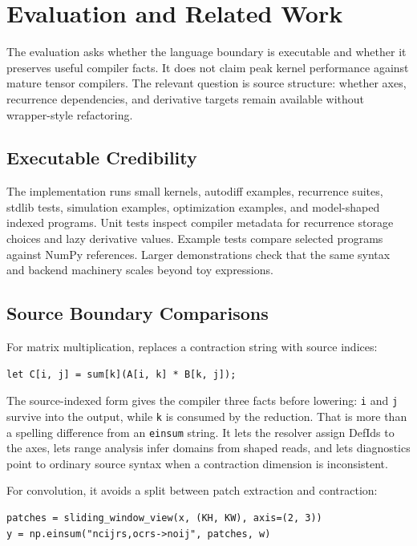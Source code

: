 \chapter{Evaluation and Related Work}

The evaluation asks whether the language boundary is executable and whether it
preserves useful compiler facts. It does not claim peak kernel performance
against mature tensor compilers. The relevant question is source structure:
whether axes, recurrence dependencies, and derivative targets remain available
without wrapper-style refactoring.

\section{Executable Credibility}

The implementation runs small kernels, autodiff examples, recurrence suites,
stdlib tests, simulation examples, optimization examples, and model-shaped
indexed programs. Unit tests inspect compiler metadata for recurrence storage
choices and lazy derivative values. Example tests compare selected programs
against NumPy references. Larger demonstrations check that the same syntax and
backend machinery scales beyond toy expressions.

\section{Source Boundary Comparisons}

For matrix multiplication, \einlang{} replaces a contraction string with source
indices:

\begin{lstlisting}[style=einlang]
let C[i, j] = sum[k](A[i, k] * B[k, j]);
\end{lstlisting}

The source-indexed form gives the compiler three facts before lowering:
\texttt{i} and \texttt{j} survive into the output, while \texttt{k} is consumed
by the reduction. That is more than a spelling difference from an
\texttt{einsum} string. It lets the resolver assign DefIds to the axes, lets
range analysis infer domains from shaped reads, and lets diagnostics point to
ordinary source syntax when a contraction dimension is inconsistent.

For convolution, it avoids a split between patch extraction and contraction:

\begin{lstlisting}[style=pythoncode]
patches = sliding_window_view(x, (KH, KW), axis=(2, 3))
y = np.einsum("ncijrs,ocrs->noij", patches, w)
\end{lstlisting}


